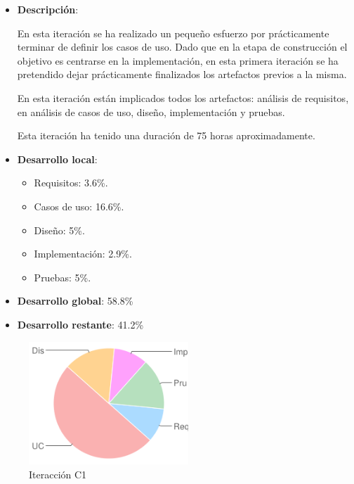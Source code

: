 \begin{itemize}    
\item {\bf Descripción}:

En esta iteración se ha realizado un pequeño esfuerzo por prácticamente terminar de definir los casos de uso. Dado que en la etapa de construcción el objetivo es centrarse en la implementación, en esta primera iteración se ha pretendido dejar prácticamente finalizados los artefactos previos a la misma.

En esta iteración están implicados todos los artefactos: análisis de requisitos, en análisis de casos de uso, diseño, implementación y pruebas.

Esta iteración ha tenido una duración de 75 horas aproximadamente.
\end{itemize}

\begin{minipage}[c]{0.45\linewidth}
  \begin{itemize}    
  \item {\bf Desarrollo local}:
    \begin{itemize}
    \item Requisitos: 3.6\%.
    \item Casos de uso: 16.6\%.
    \item Diseño: 5\%.
    \item Implementación: 2.9\%.
    \item Pruebas: 5\%.
    \end{itemize}
  \item {\bf Desarrollo global}: 58.8\%
  \item {\bf Desarrollo restante}: 41.2\%
  \end{itemize}
\end{minipage}
\begin{minipage}[c]{0.45\linewidth}
  \begin{figure}[H]
    \begin{center}
      \includegraphics[width=6cm]{images/c1.png}

      \caption{Iteracción C1}
      \label{fig::c1}
    \end{center}
  \end{figure}
\end{minipage}

